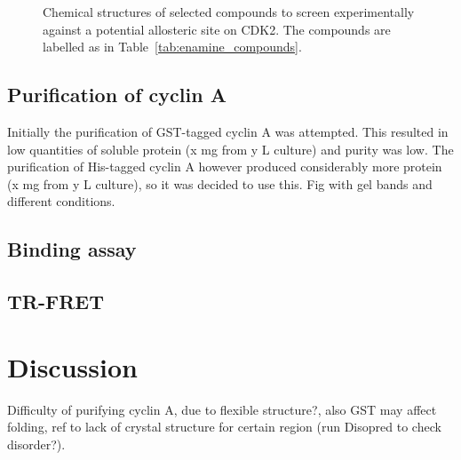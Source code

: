 \begin{figure}
\centering


\caption{Chemical structures of selected compounds to screen experimentally against a potential allosteric site on CDK2.
The compounds are labelled as in Table~\ref{tab:enamine_compounds}.}

\label{fig:compound_structures}
\end{figure}


\subsection{Purification of cyclin A}

Initially the purification of GST-tagged cyclin A was attempted.
This resulted in low quantities of soluble protein (x mg from y L culture) and purity was low.
The purification of His-tagged cyclin A however produced considerably more protein (x mg from y L culture), so it was decided to use this.
Fig with gel bands and different conditions.


\subsection{Binding assay}


\subsection{TR-FRET}


\section{Discussion}

Difficulty of purifying cyclin A, due to flexible structure?, also GST may affect folding, ref to lack of crystal structure for certain region (run Disopred to check disorder?).

